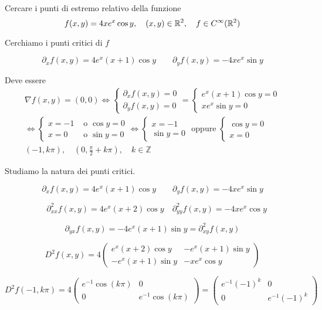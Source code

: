 \begin{exbar}
\begin{example}
	Cercare i punti di estremo relativo della funzione 
	$$f(x,y)=4xe^x\cos y, \quad (x,y)\in\mathbb{R}^2, \quad f \in C^\infty(\mathbb{R}^2)$$
	
	Cerchiamo i punti critici di $f$ 
	
	$$\partial_xf(x,y)=4e^x(x+1)\cos y \qquad \partial_yf(x,y)=-4xe^x\sin y$$
	
	Deve essere 
	\begin{gather*} 
		\nabla f(x,y)=(0,0) \Leftrightarrow 
		\begin{cases}
			\partial_x f(x,y)=0\\
			\partial_y f(x,y)=0
		\end{cases} = 
		\begin{cases}
			e^x(x+1)\cos y=0\\
			xe^x\sin y=0
		\end{cases}
		\\
		\Leftrightarrow 
		\begin{cases}
			x=-1 &\text{  o  }\cos y =0\\
			x=0 &\text{  o  }\sin y=0
		\end{cases} \Leftrightarrow 
		\begin{cases}
			x=-1\\
			\sin y =0
		\end{cases} \text{ oppure } 
		\begin{cases}
			\cos y=0\\
			x=0
		\end{cases}
		\\
		(-1,k\pi), \quad (0,\frac{\pi}{2}+k\pi), \quad k \in \mathbb{Z}
	\end{gather*}
	
	Studiamo la natura dei punti critici.
	
	$$\partial_xf(x,y)=4e^x(x+1)\cos y \qquad \partial_yf(x,y)=-4xe^x\sin y$$
	
	$$\quad \partial_{xx}^2f(x,y)=4e^x(x+2)\cos y \quad \partial_{yy}^2f(x,y)=-4xe^x \cos y$$
	
	$$ \partial_{yx}f(x,y)=-4e^x(x+1)\sin y= \partial_{xy}^2f(x,y)$$
	
	$$D^2f(x,y)=
	4 \begin{pmatrix}
		e^x(x+2)\cos y & -e^x(x+1)\sin y\\
		-e^x(x+1)\sin y & -x e^x \cos y
	\end{pmatrix}$$
	
	$$D^2f(-1, k\pi)=
	4 \begin{pmatrix}
		e^{-1}\cos(k \pi)&0\\
		0&e^{-1}\cos(k\pi)
	\end{pmatrix}=\begin{pmatrix}
		e^{-1}(-1)^k&0\\
		0&e^{-1}(-1)^k
	\end{pmatrix}$$
	

\end{example}
\end{exbar}
